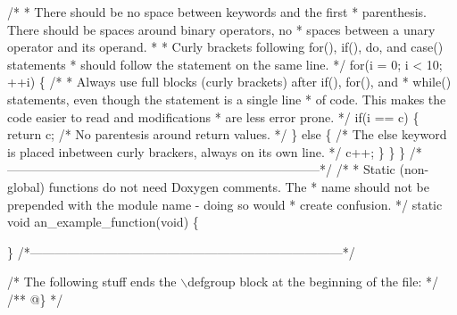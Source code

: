 \begin{DoxyCodeInclude}
  \textcolor{comment}{/*}
\textcolor{comment}{   * There should be no space between keywords and the first}
\textcolor{comment}{   * parenthesis. There should be spaces around binary operators, no}
\textcolor{comment}{   * spaces between a unary operator and its operand.}
\textcolor{comment}{   *}
\textcolor{comment}{   * Curly brackets following for(), if(), do, and case() statements}
\textcolor{comment}{   * should follow the statement on the same line.}
\textcolor{comment}{   */}
  \textcolor{keywordflow}{for}(i = 0; i < 10; ++i) \{
    \textcolor{comment}{/*}
\textcolor{comment}{     * Always use full blocks (curly brackets) after if(), for(), and}
\textcolor{comment}{     * while() statements, even though the statement is a single line}
\textcolor{comment}{     * of code. This makes the code easier to read and modifications}
\textcolor{comment}{     * are less error prone.}
\textcolor{comment}{     */}
    \textcolor{keywordflow}{if}(i == c) \{
      \textcolor{keywordflow}{return} c;           \textcolor{comment}{/* No parentesis around return values. */}
    \} \textcolor{keywordflow}{else} \{              \textcolor{comment}{/* The else keyword is placed inbetween}
\textcolor{comment}{                             curly brackers, always on its own line. */}
      c++;
    \}
  \}
\}
\textcolor{comment}{/*---------------------------------------------------------------------------*/}
\textcolor{comment}{/*}
\textcolor{comment}{ * Static (non-global) functions do not need Doxygen comments. The}
\textcolor{comment}{ * name should not be prepended with the module name - doing so would}
\textcolor{comment}{ * create confusion.}
\textcolor{comment}{ */}
\textcolor{keyword}{static} \textcolor{keywordtype}{void}
an\_example\_function(\textcolor{keywordtype}{void})
\{

\}
\textcolor{comment}{/*---------------------------------------------------------------------------*/}

\textcolor{comment}{/* The following stuff ends the \(\backslash\)defgroup block at the beginning of}
\textcolor{comment}{   the file: */}
\textcolor{comment}{}
\textcolor{comment}{/** @\} */}
\end{DoxyCodeInclude}
 